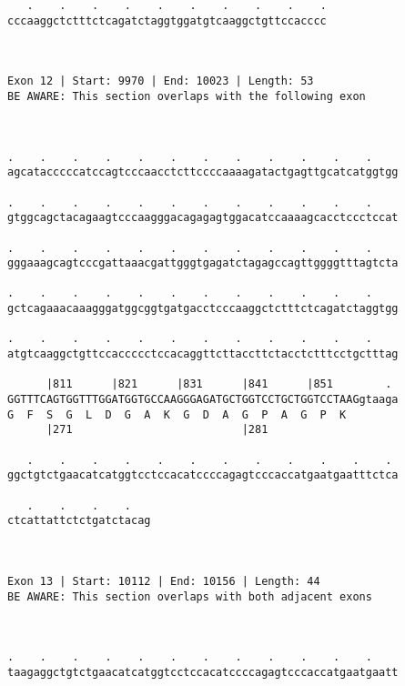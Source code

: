 \documentclass{article}
\begin{document}
\begin{Verbatim}
   .    .    .    .    .    .    .    .    .    .
cccaaggctctttctcagatctaggtggatgtcaaggctgttccacccc
                                                 
                                                 
 
Exon 12 | Start: 9970 | End: 10023 | Length: 53
BE AWARE: This section overlaps with the following exon



.    .    .    .    .    .    .    .    .    .    .    .    
agcatacccccatccagtcccaacctcttccccaaaagatactgagttgcatcatggtgg
                                                            
.    .    .    .    .    .    .    .    .    .    .    .    
gtggcagctacagaagtcccaagggacagagagtggacatccaaaagcacctccctccat
                                                            
.    .    .    .    .    .    .    .    .    .    .    .    
gggaaagcagtcccgattaaacgattgggtgagatctagagccagttggggtttagtcta
                                                            
.    .    .    .    .    .    .    .    .    .    .    .    
gctcagaaacaaagggatggcggtgatgacctcccaaggctctttctcagatctaggtgg
                                                            
.    .    .    .    .    .    .    .    .    .    .    .    
atgtcaaggctgttccaccccctccacaggttcttaccttctacctctttcctgctttag
                                                            
      |811      |821      |831      |841      |851        . 
GGTTTCAGTGGTTTGGATGGTGCCAAGGGAGATGCTGGTCCTGCTGGTCCTAAGgtaaga
G  F  S  G  L  D  G  A  K  G  D  A  G  P  A  G  P  K        
      |271                          |281                    
  
   .    .    .    .    .    .    .    .    .    .    .    . 
ggctgtctgaacatcatggtcctccacatccccagagtcccaccatgaatgaatttctca
                                                            
   .    .    .    .   
ctcattattctctgatctacag
                      
                      
 
Exon 13 | Start: 10112 | End: 10156 | Length: 44
BE AWARE: This section overlaps with both adjacent exons



.    .    .    .    .    .    .    .    .    .    .    .    
taagaggctgtctgaacatcatggtcctccacatccccagagtcccaccatgaatgaatt
                                                            

\end{Verbatim}
\end{document}
